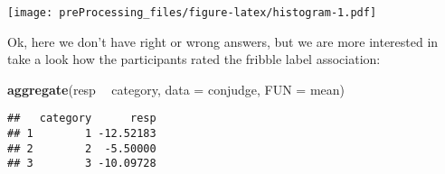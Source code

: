 \documentclass[
]{article}
\newenvironment{Shaded}{\begin{snugshade}}{\end{snugshade}}
\newcommand{\DataTypeTok}[1]{\textcolor[rgb]{0.13,0.29,0.53}{#1}}
\newcommand{\KeywordTok}[1]{\textcolor[rgb]{0.13,0.29,0.53}{\textbf{#1}}}
\newcommand{\NormalTok}[1]{#1}
\newcommand{\OperatorTok}[1]{\textcolor[rgb]{0.81,0.36,0.00}{\textbf{#1}}}
\newcommand{\StringTok}[1]{\textcolor[rgb]{0.31,0.60,0.02}{#1}}
\begin{document}
\texttt{[image: preProcessing\_files/figure-latex/histogram-1.pdf]}

Ok, here we don't have right or wrong answers, but we are more
interested in take a look how the participants rated the fribble label
association:

\begin{Shaded}
\begin{Highlighting}[]
\KeywordTok{aggregate}\NormalTok{(resp }\OperatorTok{~}\StringTok{ }\NormalTok{category, }\DataTypeTok{data =}\NormalTok{ conjudge, }\DataTypeTok{FUN =}\NormalTok{ mean)}
\end{Highlighting}
\end{Shaded}

\begin{verbatim}
##   category      resp
## 1        1 -12.52183
## 2        2  -5.50000
## 3        3 -10.09728
\end{verbatim}
\end{document}
